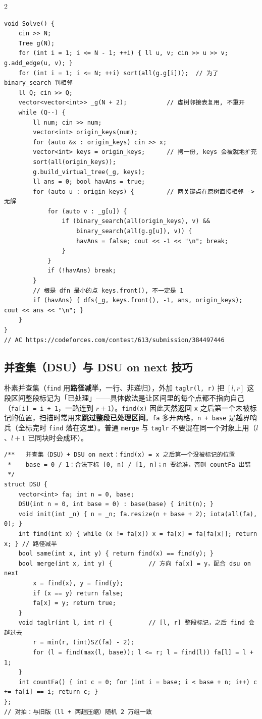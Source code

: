 \begin{multicols*}{2}
\begin{verbatim}
void Solve() {
    cin >> N;
    Tree g(N);
    for (int i = 1; i <= N - 1; ++i) { ll u, v; cin >> u >> v; g.add_edge(u, v); }
    for (int i = 1; i <= N; ++i) sort(all(g.g[i]));  // 为了 binary_search 判相邻
    ll Q; cin >> Q;
    vector<vector<int>> _g(N + 2);           // 虚树邻接表复用, 不重开
    while (Q--) {
        ll num; cin >> num;
        vector<int> origin_keys(num);
        for (auto &x : origin_keys) cin >> x;
        vector<int> keys = origin_keys;      // 拷一份, keys 会被就地扩充
        sort(all(origin_keys));
        g.build_virtual_tree(_g, keys);
        ll ans = 0; bool havAns = true;
        for (auto u : origin_keys) {         // 两关键点在原树直接相邻 -> 无解
            for (auto v : _g[u]) {
                if (binary_search(all(origin_keys), v) &&
                    binary_search(all(g.g[u]), v)) {
                    havAns = false; cout << -1 << "\n"; break;
                }
            }
            if (!havAns) break;
        }
        // 根是 dfn 最小的点 keys.front(), 不一定是 1
        if (havAns) { dfs(_g, keys.front(), -1, ans, origin_keys); cout << ans << "\n"; }
    }
}
// AC https://codeforces.com/contest/613/submission/384497446
		\end{verbatim}

		\subsection[\tochl{并查集（DSU）与 DSU on next 技巧}]{并查集（DSU）与 DSU on next 技巧}

		朴素并查集（\texttt{find} 用\textbf{路径减半}，一行、非递归），外加 \texttt{taglr(l, r)} 把 $[l, r]$ 这段区间整段标记为「已处理」——具体做法是让区间里的每个点都不指向自己（\texttt{fa[i] = i + 1}，一路连到 $r+1$）。\texttt{find(x)} 因此天然返回 \texttt{x} 之后第一个未被标记的位置，扫描时常用来\textbf{跳过整段已处理区间}。\texttt{fa} 多开两格，\texttt{n + base} 是越界哨兵（全标完时 \texttt{find} 落在这里）。普通 \texttt{merge} 与 \texttt{taglr} 不要混在同一个对象上用（$l$、$l+1$ 已同块时会成环）。

		\begin{verbatim}
/**   并查集（DSU）+ DSU on next：find(x) = x 之后第一个没被标记的位置
 *    base = 0 / 1：合法下标 [0, n) / [1, n]；n 要给准，否则 countFa 出错
 */
struct DSU {
    vector<int> fa; int n = 0, base;
    DSU(int n = 0, int base = 0) : base(base) { init(n); }
    void init(int _n) { n = _n; fa.resize(n + base + 2); iota(all(fa), 0); }
    int find(int x) { while (x != fa[x]) x = fa[x] = fa[fa[x]]; return x; } // 路径减半
    bool same(int x, int y) { return find(x) == find(y); }
    bool merge(int x, int y) {          // 方向 fa[x] = y，配合 dsu on next
        x = find(x), y = find(y);
        if (x == y) return false;
        fa[x] = y; return true;
    }
    void taglr(int l, int r) {          // [l, r] 整段标记，之后 find 会越过去
        r = min(r, (int)SZ(fa) - 2);
        for (l = find(max(l, base)); l <= r; l = find(l)) fa[l] = l + 1;
    }
    int countFa() { int c = 0; for (int i = base; i < base + n; i++) c += fa[i] == i; return c; }
};
// 对拍：与旧版（ll + 两趟压缩）随机 2 万组一致
		\end{verbatim}


\end{multicols*}
